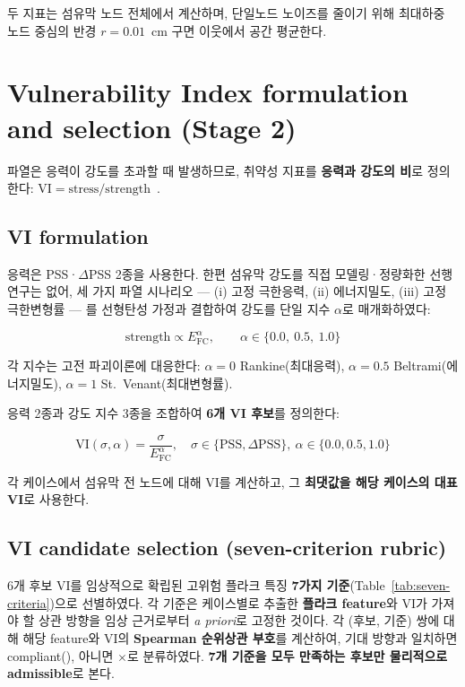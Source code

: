 \documentclass[master,english,final]{kaist-ucs}
\begin{document}
두 지표는 섬유막 노드 전체에서 계산하며, 단일노드 노이즈를 줄이기 위해 최대하중 노드 중심의 반경 $r=0.01$~cm 구면 이웃에서 공간 평균한다.

\section{Vulnerability Index formulation and selection (Stage 2)}

파열은 응력이 강도를 초과할 때 발생하므로, 취약성 지표를 \textbf{응력과 강도의 비}로 정의한다: $\mathrm{VI}=\mathrm{stress}/\mathrm{strength}$~\cite{corti_review}.

\subsection{VI formulation}

응력은 PSS·$\Delta$PSS 2종을 사용한다. 한편 섬유막 강도를 직접 모델링·정량화한 선행연구는 없어, 세 가지 파열 시나리오 --- (i) 고정 극한응력, (ii) 에너지밀도, (iii) 고정 극한변형률 --- 를 선형탄성 가정과 결합하여 강도를 단일 지수 $\alpha$로 매개화하였다:

\begin{equation}
\mathrm{strength} \propto E_\mathrm{FC}^{\alpha}, \qquad \alpha \in \{0.0,\ 0.5,\ 1.0\}
\end{equation}

각 지수는 고전 파괴이론에 대응한다: $\alpha=0$ Rankine(최대응력), $\alpha=0.5$ Beltrami(에너지밀도), $\alpha=1$ St.~Venant(최대변형률).

응력 2종과 강도 지수 3종을 조합하여 \textbf{6개 VI 후보}를 정의한다:

\begin{equation}
\mathrm{VI}(\sigma,\alpha) = \frac{\sigma}{E_\mathrm{FC}^{\alpha}}, \quad \sigma\in\{\mathrm{PSS},\Delta\mathrm{PSS}\},\ \alpha\in\{0.0,0.5,1.0\}
\end{equation}

각 케이스에서 섬유막 전 노드에 대해 VI를 계산하고, 그 \textbf{최댓값을 해당 케이스의 대표 VI}로 사용한다.

\subsection{VI candidate selection (seven-criterion rubric)}

6개 후보 VI를 임상적으로 확립된 고위험 플라크 특징 \textbf{7가지 기준}(Table~\ref{tab:seven-criteria})으로 선별하였다. 각 기준은 케이스별로 추출한 \textbf{플라크 feature}와 VI가 가져야 할 상관 방향을 임상 근거로부터 \emph{a priori}로 고정한 것이다. 각 (후보, 기준) 쌍에 대해 해당 feature와 VI의 \textbf{Spearman 순위상관 부호}를 계산하여, 기대 방향과 일치하면 compliant(\checkmark), 아니면 $\times$로 분류하였다. \textbf{7개 기준을 모두 만족하는 후보만 물리적으로 admissible}로 본다.
\end{document}
